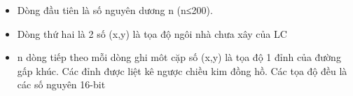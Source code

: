 \begin{itemize}
	\item     Dòng đầu tiên là số nguyên dương n (n≤200).   
	\item     Dòng thứ hai là 2 số (x,y) là tọa độ ngôi nhà chưa xây của LC   
	\item     n dòng tiếp theo mỗi dòng ghi môt cặp số (x,y) là tọa độ 1 đỉnh của đường gấp khúc. Các đỉnh được liệt kê ngược chiều kim đồng hồ. Các tọa độ đều là các số nguyên 16-bit   
\end{itemize}

\